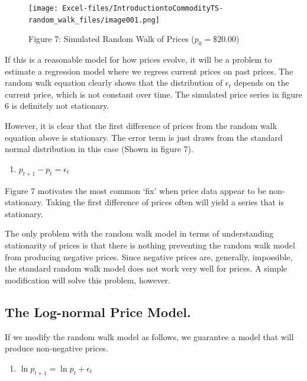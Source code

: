\documentclass[
]{book}
\providecommand{\tightlist}{%
  \setlength{\itemsep}{0pt}\setlength{\parskip}{0pt}}
\begin{document}
\begin{figure}
\centering
\texttt{[image: Excel-files/IntroductiontoCommodityTS-random\_walk\_files/image001.png]}
\caption{Figure 7: Simulated Random Walk of Prices (\(p_0 = \$20.00\))}
\end{figure}

If this is a reasonable model for how prices evolve, it will be a problem to estimate a regression model where we regress current prices on past prices. The random walk equation clearly shows that the distribution of \(\epsilon_t\) depends on the current price, which is not constant over time. The simulated price series in figure 6 is definitely not stationary.

However, it is clear that the first difference of prices from the random walk equation above is stationary. The error term is just draws from the standard normal distribution in this case (Shown in figure 7).

\begin{enumerate}
\def\labelenumi{(\arabic{enumi})}
\setcounter{enumi}{3}
\tightlist
\item
  \(p_{t+1} - p_{t} = \epsilon_t\)
\end{enumerate}

Figure 7 motivates the most common `fix' when price data appear to be non-stationary. Taking the first difference of prices often will yield a series that is stationary.

The only problem with the random walk model in terms of understanding stationarity of prices is that there is nothing preventing the random walk model from producing negative prices. Since negative prices are, generally, impossible, the standard random walk model does not work very well for prices. A simple modification will solve this problem, however.

\hypertarget{the-log-normal-price-model.}{%
\subsection{The Log-normal Price Model.}\label{the-log-normal-price-model.}}

If we modify the random walk model as follows, we guarantee a model that will produce non-negative prices.

\begin{enumerate}
\def\labelenumi{(\arabic{enumi})}
\setcounter{enumi}{4}
\tightlist
\item
  \(\ln{p_{t+1}} = \ln{p_{t}} + \epsilon_t\)
\end{enumerate}
\end{document}

